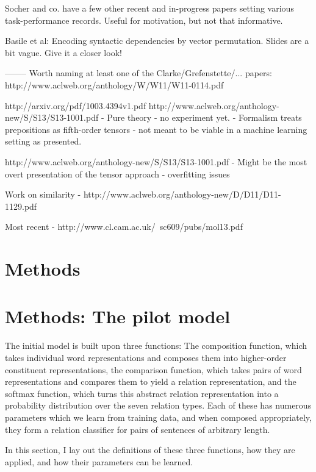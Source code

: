 \documentclass[10pt,letterpaper]{article}
\begin{document}
Socher and co. have a few other recent and in-progress papers setting various task-performance records. Useful for motivation, but not that informative.


Basile et al: Encoding syntactic dependencies by vector permutation. Slides are a bit vague. Give it a closer look!

--------
Worth naming at least one of the Clarke/Grefenstette/... papers:
http://www.aclweb.org/anthology/W/W11/W11-0114.pdf

http://arxiv.org/pdf/1003.4394v1.pdf
http://www.aclweb.org/anthology-new/S/S13/S13-1001.pdf
- Pure theory - no experiment yet.
- Formalism treats prepositions as fifth-order tensors - not meant to be viable in a machine learning setting as presented.

http://www.aclweb.org/anthology-new/S/S13/S13-1001.pdf
- Might be the most overt presentation of the tensor approach
- overfitting issues

Work on similarity
- http://www.aclweb.org/anthology-new/D/D11/D11-1129.pdf

Most recent
- http://www.cl.cam.ac.uk/~sc609/pubs/mol13.pdf

\section{Methods}

\section{Methods: The pilot model}

The initial model is built upon three functions: The composition function, which takes individual word representations and composes them into higher-order constituent representations, the comparison function, which takes pairs of word representations and compares them to yield a relation representation, and the softmax function, which turns this abstract relation representation into a probability distribution over the seven relation types. Each of these has numerous parameters which we learn from training data, and when composed appropriately, they form a relation classifier for pairs of sentences of arbitrary length. 

In this section, I lay out the definitions of these three functions, how they are applied, and how their parameters can be learned.
\end{document}
